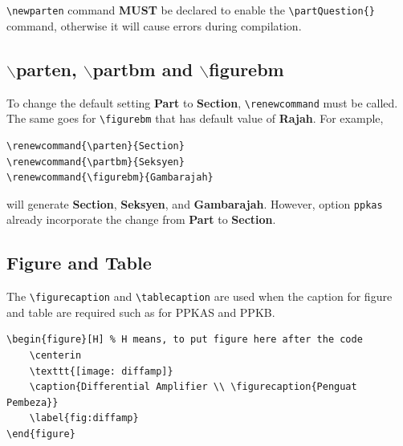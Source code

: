 \documentclass[12pt]{article}
\begin{document}
\begin{framed}
	\setcounter{counterpart}{0}
	
	\\
	
	\partQuestion{}
	
	\partQuestion{}
	
	
	\\
	
	\partQuestion{}
	
	\partQuestion{}
	
\end{framed}

\verb|\newparten| command \textbf{MUST} be declared to enable the \verb|\partQuestion{}| command, otherwise it will cause errors during compilation. 

\subsection{$\backslash$parten, $\backslash$partbm and $\backslash$figurebm}
To change the default setting \textbf{Part} to \textbf{Section}, \verb|\renewcommand| must be called. The same goes for \verb|\figurebm| that has default value of \textbf{Rajah}. For example, 

\begin{lstlisting}[basicstyle=\footnotesize, frame=single]
\renewcommand{\parten}{Section}
\renewcommand{\partbm}{Seksyen}
\renewcommand{\figurebm}{Gambarajah}
\end{lstlisting}

will generate \textbf{Section}, \textbf{Seksyen}, and \textbf{Gambarajah}. However, option \verb|ppkas| already incorporate the change from \textbf{Part} to \textbf{Section}. 

\subsection{Figure and Table}

The \verb|\figurecaption| and \verb|\tablecaption| are used when the caption for figure and table are required such as for PPKAS and PPKB. 

\begin{lstlisting}[basicstyle=\footnotesize, frame=single]
\begin{figure}[H] % H means, to put figure here after the code
	\centerin
	\texttt{[image: diffamp]}
	\caption{Differential Amplifier \\ \figurecaption{Penguat Pembeza}}
	\label{fig:diffamp}
\end{figure}
\end{lstlisting}
\end{document}

